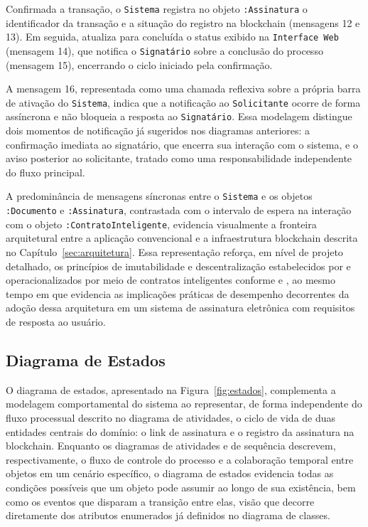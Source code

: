 \documentclass[
    12pt,
    a4paper,
    oneside,
    chapter=TITLE,
    section=TITLE,
    subsection=TITLE,
    subsubsection=TITLE,
    sumario=tradicional,
    english,
    brazil
]{abntex2}
\newcommand{\elem}[1]{\texttt{#1}}
\begin{document}
Confirmada a transação, o \elem{Sistema} registra no objeto \elem{:Assinatura} o identificador da transação e a situação do registro na blockchain (mensagens 12 e 13). Em seguida, atualiza para concluída o status exibido na \elem{Interface Web} (mensagem 14), que notifica o \elem{Signatário} sobre a conclusão do processo (mensagem 15), encerrando o ciclo iniciado pela confirmação.

A mensagem 16, representada como uma chamada reflexiva sobre a própria barra de ativação do \elem{Sistema}, indica que a notificação ao \elem{Solicitante} ocorre de forma assíncrona e não bloqueia a resposta ao \elem{Signatário}. Essa modelagem distingue dois momentos de notificação já sugeridos nos diagramas anteriores: a confirmação imediata ao signatário, que encerra sua interação com o sistema, e o aviso posterior ao solicitante, tratado como uma responsabilidade independente do fluxo principal.

A predominância de mensagens síncronas entre o \elem{Sistema} e os objetos \elem{:Documento} e \elem{:Assinatura}, contrastada com o intervalo de espera na interação com o objeto \elem{:ContratoInteligente}, evidencia visualmente a fronteira arquitetural entre a aplicação convencional e a infraestrutura blockchain descrita no Capítulo~\ref{sec:arquitetura}. Essa representação reforça, em nível de projeto detalhado, os princípios de imutabilidade e descentralização estabelecidos por  e operacionalizados por meio de contratos inteligentes conforme  e , ao mesmo tempo em que evidencia as implicações práticas de desempenho decorrentes da adoção dessa arquitetura em um sistema de assinatura eletrônica com requisitos de resposta ao usuário.

\subsection{Diagrama de Estados}
\label{sec:estados}

O diagrama de estados, apresentado na Figura~\ref{fig:estados}, complementa a modelagem comportamental do sistema ao representar, de forma independente do fluxo processual descrito no diagrama de atividades, o ciclo de vida de duas entidades centrais do domínio: o link de assinatura e o registro da assinatura na blockchain. Enquanto os diagramas de atividades e de sequência descrevem, respectivamente, o fluxo de controle do processo e a colaboração temporal entre objetos em um cenário específico, o diagrama de estados evidencia todas as condições possíveis que um objeto pode assumir ao longo de sua existência, bem como os eventos que disparam a transição entre elas, visão que decorre diretamente dos atributos enumerados já definidos no diagrama de classes.
\end{document}
